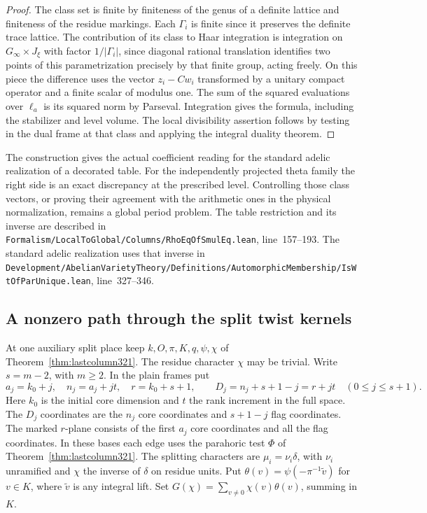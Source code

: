 \documentclass[a4paper,11pt]{article}
\theoremstyle{definition}
\theoremstyle{remark}
\newcommand{\srcloc}[2]{{\small\nolinkurl{#1.lean}}, line~#2}
\numberwithin{equation}{section}
\begin{document}
\begin{proof}
The class set is finite by finiteness of the genus of a
definite lattice and finiteness of the residue markings.
Each \(\Gamma_i\) is finite since it preserves the
definite trace lattice. The contribution of its class to
Haar integration is integration on \(G_\infty\times J_\xi\)
with factor \(1/|\Gamma_i|\), since diagonal rational
translation identifies two points of this parametrization
precisely by that finite group, acting freely. On this
piece the difference uses the vector \(z_i-Cw_i\)
transformed by a unitary compact operator and a finite
scalar of modulus one. The sum of the squared evaluations
over \(\ell_a\) is its squared norm by Parseval. Integration
gives the formula, including the stabilizer and level
volume. The local divisibility assertion follows by testing
in the dual frame at that class and applying the integral
duality theorem.
\end{proof}

The construction gives the actual coefficient reading for
the standard adelic realization of a decorated table. For
the independently projected theta family the right side is
an exact discrepancy at the prescribed level. Controlling
those class vectors, or proving their agreement with the
arithmetic ones in the physical normalization, remains a
global period problem. The table restriction and its inverse
are described in
\srcloc{Formalism/LocalToGlobal/Columns/RhoEqOfSmulEq}{157--193}.
The standard adelic realization uses that inverse in
\srcloc{Development/AbelianVarietyTheory/Definitions/AutomorphicMembership/IsWtOfParUnique}{327--346}.

\subsection{A nonzero path through the split twist kernels}\label{nav:VI-65}
At one auxiliary split place keep \(k,O,\pi,K,q,\psi,\chi\)
of Theorem~\ref{thm:lastcolumn321}. The residue character
\(\chi\) may be trivial. Write \(s=m-2\), with \(m\ge2\).
In the plain frames put
\[
 a_j=k_0+j,\quad n_j=a_j+jt,\quad r=k_0+s+1,\qquad
 D_j=n_j+s+1-j=r+jt \quad(0\le j\le s+1).
\]
Here \(k_0\) is the initial core dimension and \(t\) the
rank increment in the full space. The \(D_j\) coordinates
are the \(n_j\) core coordinates and \(s+1-j\) flag
coordinates. The marked \(r\)-plane consists of the first
\(a_j\) core coordinates and all the flag coordinates.
In these bases each edge uses the parahoric test \(\Phi\)
of Theorem~\ref{thm:lastcolumn321}. The splitting characters
are \(\mu_i=\nu_i\delta\), with \(\nu_i\) unramified and
\(\chi\) the inverse of \(\delta\) on residue units. Put
\(\theta(v)=\psi(-\pi^{-1}\widetilde v)\) for \(v\in K\), where
\(\widetilde v\) is any integral lift. Set
\(G(\chi)=\sum_{v\ne0}\chi(v)\theta(v)\), summing in \(K\).
\end{document}
